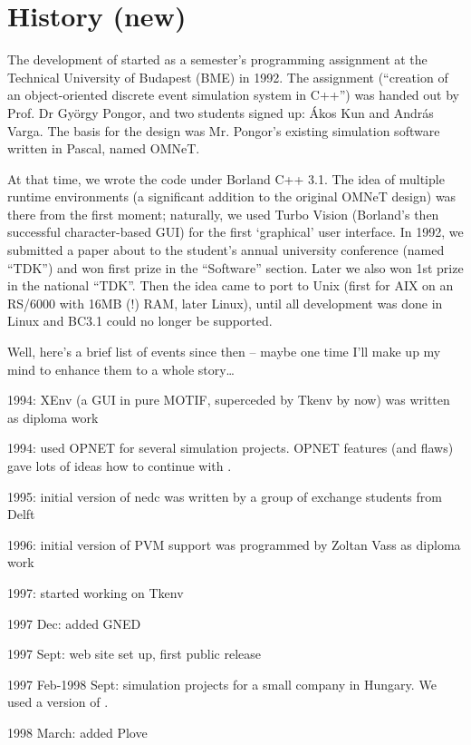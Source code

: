 \section{History (new)}

The development of {\opp} started as a semester's programming 
assignment at the Technical University of Budapest (BME) in 1992. 
The assignment (``creation of an object-oriented discrete event 
simulation system in C++'') was handed out by Prof. Dr Gy\"{o}rgy 
Pongor, and two students signed up: \'{A}kos Kun and Andr\'{a}s Varga. 
The basis for the design was Mr. Pongor's existing simulation 
software written in Pascal, named OMNeT.

At that time, we wrote the code under Borland C++ 3.1. The idea 
of multiple runtime environments (a significant addition to the 
original OMNeT design) was there from the first moment; naturally, 
we used Turbo Vision (Borland's then successful character-based 
GUI) for the first `graphical' user interface. In 1992, we submitted 
a paper about {\opp} to the student's annual university conference 
(named ``TDK'') and won first prize in the ``Software'' section. 
Later we also won 1st prize in the national ``TDK''. Then the 
idea came to port {\opp} to Unix (first for AIX on an RS/6000 
with 16MB (!) RAM, later Linux), until all development was done 
in Linux and BC3.1 could no longer be supported.

Well, here's a brief list of events since then -- maybe one time 
I'll make up my mind to enhance them to a whole story\dots 

1994: XEnv (a GUI in pure MOTIF, superceded by Tkenv by now) 
was written as diploma work

1994: used OPNET for several simulation projects. OPNET features 
(and flaws) gave lots of ideas how to continue with {\opp}.

1995: initial version of nedc was written by a group of exchange 
students from Delft

1996: initial version of PVM support was programmed by Zoltan 
Vass as diploma work

1997: started working on Tkenv

1997 Dec: added GNED

1997 Sept: web site set up, first public release

1997 Feb-1998 Sept: simulation projects for a small company in 
Hungary. We used a version of {\opp}.

1998 March: added Plove

